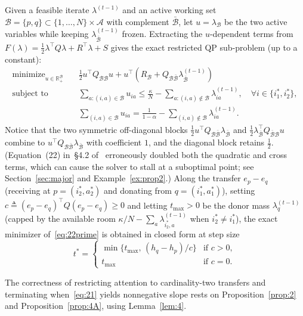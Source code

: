 \documentclass[11pt,letterpaper]{article}
\newcommand{\R}{\mathbb{R}}
\newcommand{\defeq}{\triangleq}
\theoremstyle{definition}
\begin{document}
Given a feasible iterate $\lambda^{(t-1)}$ and an active working set $\mathcal{B} = \{p,q\} \subset \{1,\ldots,N\}\times\mathcal{A}$ with complement $\bar{\mathcal{B}}$, let $u = \lambda_{\mathcal{B}}$ be the two active variables while keeping $\lambda_{\bar{\mathcal{B}}}^{(t-1)}$ frozen. Extracting the $u$-dependent terms from $F(\lambda) = \frac{1}{2}\lambda^\top Q\lambda + R^\top \lambda + S$ gives the exact restricted QP sub-problem (up to a constant):
\begin{equation}
\begin{aligned}
 \text{minimize}_{u\in\R_+^{\mathcal{B}}}\quad &
   \frac{1}{2} u^\top Q_{\mathcal{B}\mathcal{B}} u + u^\top\!\left(R_{\mathcal{B}} + Q_{\mathcal{B}\bar{\mathcal{B}}}\lambda_{\bar{\mathcal{B}}}^{(t-1)}\right) \\
 \text{subject to}\quad &
   \sum_{a : (i,a)\in\mathcal{B}} u_{ia} \le \frac{\kappa}{N} - \sum_{a : (i,a)\notin\mathcal{B}} \lambda_{ia}^{(t-1)}, \quad \forall i \in \{i_1^*, i_2^*\}, \\
 & \sum_{(i,a)\in\mathcal{B}} u_{ia} = \frac{1}{1-\alpha} - \sum_{(i,a)\notin\mathcal{B}} \lambda_{ia}^{(t-1)}.
\end{aligned}
\tag{22$'$}\label{eq:22prime}
\end{equation}
Notice that the two symmetric off-diagonal blocks $\frac{1}{2}u^\top Q_{\mathcal{B}\bar{\mathcal{B}}}\lambda_{\bar{\mathcal{B}}}$ and $\frac{1}{2}\lambda_{\bar{\mathcal{B}}}^\top Q_{\bar{\mathcal{B}}\mathcal{B}} u$ combine to $u^\top Q_{\mathcal{B}\bar{\mathcal{B}}}\lambda_{\bar{\mathcal{B}}}$ with coefficient $1$, and the diagonal block retains $\frac{1}{2}$. (Equation~(22) in~\S4.2 of~\cite{BFMZ22} erroneously doubled both the quadratic and cross terms, which can cause the solver to stall at a suboptimal point; see Section~\ref{sec:major} and Example~\ref{ex:prop2}.) Along the transfer $e_p - e_q$ (receiving at $p=(i_2^*,a_2^*)$ and donating from $q=(i_1^*,a_1^*)$), setting $c \defeq (e_p - e_q)^\top Q (e_p - e_q) \ge 0$ and letting $t_{\max} > 0$ be the donor mass $\lambda_q^{(t-1)}$ (capped by the available room $\kappa/N - \sum_a \lambda_{i_2^*,a}^{(t-1)}$ when $i_2^* \ne i_1^*$), the exact minimizer of~\eqref{eq:22prime} is obtained in closed form at step size
\[
 t^* = \begin{cases}
   \min\bigl\{t_{\max},\, (h_q - h_p)/c\bigr\} & \text{if } c > 0,\\
   t_{\max} & \text{if } c = 0.
 \end{cases}
\]

The correctness of restricting attention to cardinality-two transfers and terminating when~\eqref{eq:21} yields nonnegative slope rests on Proposition~\ref{prop:2} and Proposition~\ref{prop:4A}, using Lemma~\ref{lem:4}.
\end{document}
